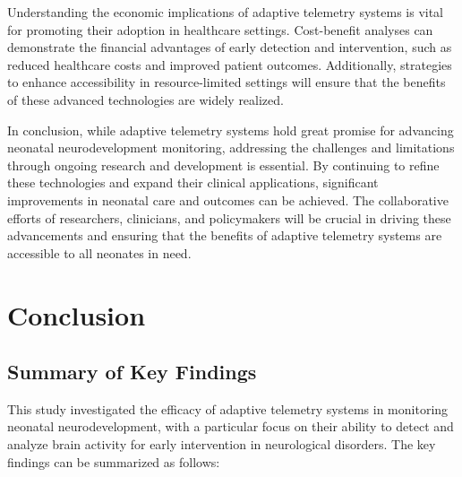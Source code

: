 \documentclass[12pt,journal,compsoc]{IEEEtran}
\begin{document}
Understanding the economic implications of adaptive telemetry systems is vital for promoting their adoption in healthcare settings. Cost-benefit analyses can demonstrate the financial advantages of early detection and intervention, such as reduced healthcare costs and improved patient outcomes. Additionally, strategies to enhance accessibility in resource-limited settings will ensure that the benefits of these advanced technologies are widely realized.

In conclusion, while adaptive telemetry systems hold great promise for advancing neonatal neurodevelopment monitoring, addressing the challenges and limitations through ongoing research and development is essential. By continuing to refine these technologies and expand their clinical applications, significant improvements in neonatal care and outcomes can be achieved. The collaborative efforts of researchers, clinicians, and policymakers will be crucial in driving these advancements and ensuring that the benefits of adaptive telemetry systems are accessible to all neonates in need.


\section{Conclusion}

\subsection{Summary of Key Findings}

This study investigated the efficacy of adaptive telemetry systems in monitoring neonatal neurodevelopment, with a particular focus on their ability to detect and analyze brain activity for early intervention in neurological disorders. The key findings can be summarized as follows:
\end{document}
